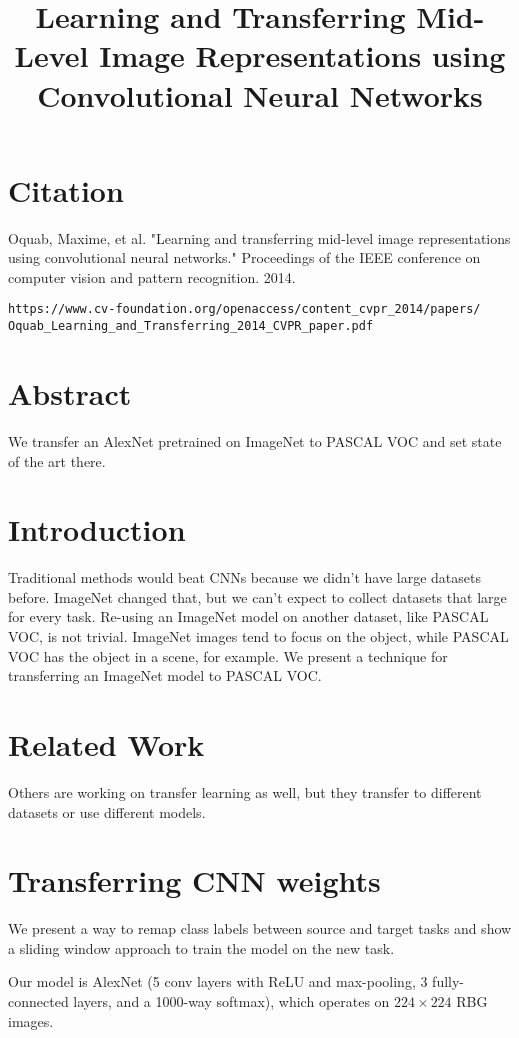\documentclass[a4paper]{article}
\title{Learning and Transferring Mid-Level Image Representations
using Convolutional Neural Networks}
\date{}
\begin{document}
\maketitle

\section{Citation}
Oquab, Maxime, et al. "Learning and transferring mid-level image representations using convolutional neural networks." Proceedings of the IEEE conference on computer vision and pattern recognition. 2014.

\begin{verbatim}
https://www.cv-foundation.org/openaccess/content_cvpr_2014/papers/
Oquab_Learning_and_Transferring_2014_CVPR_paper.pdf
\end{verbatim}

\section{Abstract}
We transfer an AlexNet pretrained on ImageNet to PASCAL VOC and set state of
the art there.

\section{Introduction}
Traditional methods would beat CNNs because we didn't have large datasets
before. ImageNet changed that, but we can't expect to collect datasets that
large for every task. Re-using an ImageNet model on another dataset, like
PASCAL VOC, is not trivial. ImageNet images tend to focus on the object,
while PASCAL VOC has the object in a scene, for example. We present a
technique for transferring an ImageNet model to PASCAL VOC.

\section{Related Work}
Others are working on transfer learning as well, but they transfer to different
datasets or use different models.

\section{Transferring CNN weights}
We present a way to remap class labels between source and target tasks and
show a sliding window approach to train the model on the new task.

Our model is AlexNet (5 conv layers with ReLU and max-pooling, 3 fully-connected
layers, and a 1000-way softmax), which operates on $224 \times 224$ RBG images.
\end{document}
